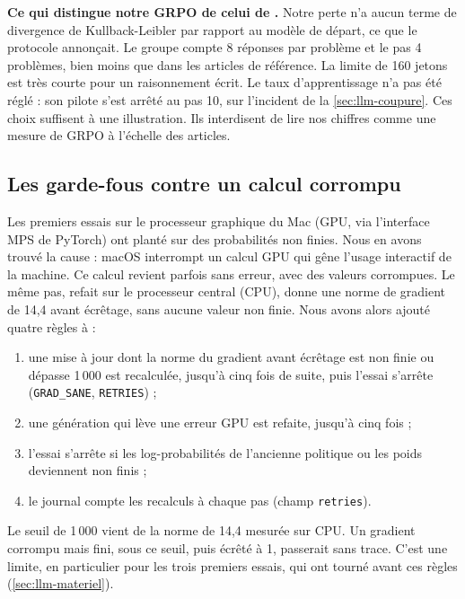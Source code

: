 \begin{notebox}
\textbf{Ce qui distingue notre GRPO de celui de \textcite{shao2024deepseekmath}.} Notre perte n'a
aucun terme de divergence de Kullback-Leibler par rapport au modèle de départ, ce que le protocole
annonçait. Le groupe compte 8 réponses par problème et le pas 4 problèmes, bien
moins que dans les articles de référence. La limite de 160 jetons est très courte pour un
raisonnement écrit. Le taux d'apprentissage n'a pas été réglé : son pilote s'est arrêté au pas 10, sur
l'incident de la \cref{sec:llm-coupure}. Ces choix suffisent à une illustration. Ils interdisent de lire nos chiffres
comme une mesure de GRPO à l'échelle des articles.
\end{notebox}

\subsection{Les garde-fous contre un calcul corrompu}

Les premiers essais sur le processeur graphique du Mac (GPU, via l'interface MPS de PyTorch) ont
planté sur des probabilités non finies. Nous en avons trouvé la cause : macOS interrompt un calcul GPU qui gêne l'usage interactif de la machine. Ce calcul revient parfois
sans erreur, avec des valeurs corrompues. Le même pas, refait sur le processeur central (CPU), donne
une norme de gradient de 14,4 avant écrêtage, sans aucune valeur non finie. Nous avons alors ajouté
quatre règles à  :
\begin{enumerate}
  \item une mise à jour dont la norme du gradient avant écrêtage est non finie ou dépasse 1\,000 est
        recalculée, jusqu'à cinq fois de suite, puis l'essai s'arrête (\texttt{GRAD\_SANE},
        \texttt{RETRIES}) ;
  \item une génération qui lève une erreur GPU est refaite, jusqu'à cinq fois ;
  \item l'essai s'arrête si les log-probabilités de l'ancienne politique ou les poids deviennent non finis ;
  \item le journal compte les recalculs à chaque pas (champ \texttt{retries}).
\end{enumerate}
Le seuil de 1\,000 vient de la norme de 14,4 mesurée sur CPU. Un gradient corrompu mais fini, sous
ce seuil, puis écrêté à 1, passerait sans trace. C'est une limite, en particulier pour les trois premiers
essais, qui ont tourné avant ces règles (\cref{sec:llm-materiel}).

